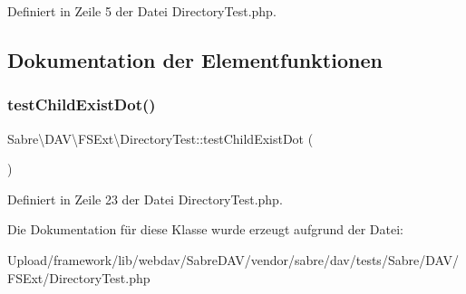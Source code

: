 Definiert in Zeile 5 der Datei Directory\+Test.\+php.



\subsection{Dokumentation der Elementfunktionen}
\mbox{\label{class_sabre_1_1_d_a_v_1_1_f_s_ext_1_1_directory_test_a7f364bfba47fabceeb77c481395f4d47}} 
\subsubsection{\texorpdfstring{test\+Child\+Exist\+Dot()}{testChildExistDot()}}
{\footnotesize\ttfamily Sabre\textbackslash{}\+D\+A\+V\textbackslash{}\+F\+S\+Ext\textbackslash{}\+Directory\+Test\+::test\+Child\+Exist\+Dot (\begin{DoxyParamCaption}{ }\end{DoxyParamCaption})}



Definiert in Zeile 23 der Datei Directory\+Test.\+php.



Die Dokumentation für diese Klasse wurde erzeugt aufgrund der Datei\+:\begin{DoxyCompactItemize}
\item 
Upload/framework/lib/webdav/\+Sabre\+D\+A\+V/vendor/sabre/dav/tests/\+Sabre/\+D\+A\+V/\+F\+S\+Ext/Directory\+Test.\+php\end{DoxyCompactItemize}
